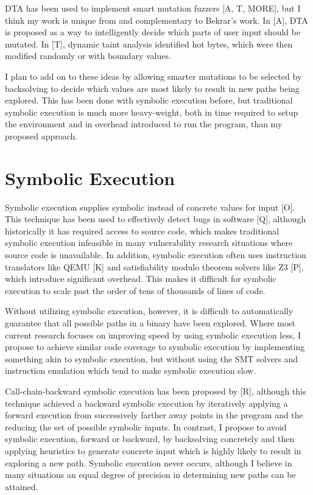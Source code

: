 \documentclass[11pt,expanded,copyright]{fsuthesis}
\begin{document}
DTA has been used to implement smart mutation fuzzers [A, T, MORE], but I think my work is unique from and complementary to Bekrar's work. In [A], DTA is proposed as a way to intelligently decide which parts of user input should be mutated. In [T], dynamic taint analysis identified hot bytes, which were then modified randomly or with boundary values.

I plan to add on to these ideas by allowing smarter mutations to be selected by backsolving to decide which values are most likely to result in new paths being explored. This has been done with symbolic execution before, but traditional symbolic execution is much more heavy-weight, both in time required to setup the environment and in overhead introduced to run the program, than my proposed approach.

\section{Symbolic Execution}

Symbolic execution supplies symbolic instead of concrete values for input [O]. This technique has been used to effectively detect bugs in software [Q], although historically it has required access to source code, which makes traditional symbolic execution infeasible in many vulnerability research situations where source code is unavailable. In addition, symbolic execution often uses instruction translators like QEMU [K] and satisfiability modulo theorem solvers like Z3 [P], which introduce significant overhead. This makes it difficult for symbolic execution to scale past the order of tens of thousands of lines of code. 

Without utilizing symbolic execution, however, it is difficult to automatically guarantee that all possible paths in a binary have been explored. Where most current research focuses on improving speed by using symbolic execution less, I propose to achieve similar code coverage to symbolic execution by implementing something akin to symbolic execution, but without using the SMT solvers and instruction emulation which tend to make symbolic execution slow.

Call-chain-backward symbolic execution has been proposed by [R], although this technique achieved a backward symbolic execution by iteratively applying a forward execution from successively farther away points in the program and the reducing the set of possible symbolic inputs. In contrast, I propose to avoid symbolic execution, forward or backward, by backsolving concretely and then applying heuristics to generate concrete input which is highly likely to result in exploring a new path. Symbolic execution never occurs, although I believe in many situations an equal degree of precision in determining new paths can be attained.
\end{document}
